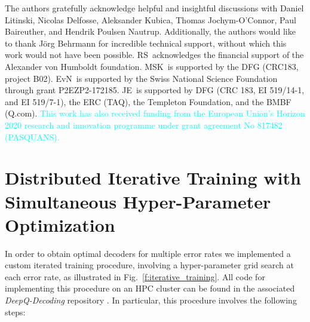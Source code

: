 \documentclass[twocolumn,preprintnumbers,amsmath,amssymb,notitlepage,nofootinbib,longbibliography,superscriptaddress,aps,pra,10pt]{revtex4-1}
\newcommand{\je}[1]{\textcolor{cyan}{#1}}
\begin{document}
	\begin{acknowledgments}
		The authors gratefully acknowledge helpful and insightful discussions with Daniel Litinski, Nicolas Delfosse, Aleksander Kubica, Thomas Jochym-O'Connor, Paul Baireuther, and Hendrik Poulsen Nautrup.
		Additionally, the authors would like to thank J\"{o}rg Behrmann for incredible technical support, without which this work would not have been possible.
		RS\ acknowledges the financial support of the Alexander von Humboldt foundation.
		MSK\ is supported by the DFG (CRC183, project B02).
		EvN\ is supported by the Swiss National Science Foundation through grant P2EZP2-172185.
		JE\ is supported by DFG (CRC 183, EI 519/14-1, and EI 519/7-1), the ERC (TAQ), the Templeton Foundation, and the BMBF (Q.com).
		\je{This work has also received funding from the European Union's Horizon 2020
		research and innovation programme under grant agreement No 817482 (PASQUANS).}
	\end{acknowledgments}

\appendix

\section{Distributed Iterative Training with Simultaneous Hyper-Parameter Optimization}\label{A:training}

	In order to obtain optimal decoders for multiple error rates we implemented a custom iterated training procedure, involving a hyper-parameter grid search at each error rate, as illustrated in Fig.\ \ref{f:iterative_training}. All code for implementing this procedure on an HPC cluster can be found in the associated \emph{DeepQ-Decoding} repository \cite{DeepQDecoding}. In particular, this procedure involves the following steps:
\end{document}
